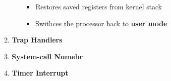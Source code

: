 \documentclass[12pt]{article}
\begin{document}
\begin{mdframed}
\begin{enumerate}[1.]
\begin{itemize}
        \begin{itemize}
            \item Restores saved registers from kernel stack
            \item Swithces the processor back to \textbf{user mode}
        \end{itemize}
    \end{itemize}
    \item \textbf{Trap Handlers}
    \item \textbf{System-call Numebr}
    \item \textbf{Timer Interrupt}
\end{enumerate}

\end{mdframed}
\end{document}
